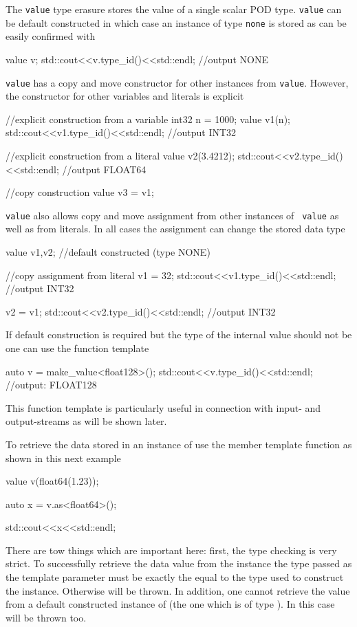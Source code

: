 The {\tt value} type erasure stores the value of a single scalar POD type. 
{\tt value} can be default constructed in which case an instance of type 
{\tt none} is stored as can be easily confirmed with
\begin{cppcode}
value v;
std::cout<<v.type_id()<<std::endl; //output NONE
\end{cppcode}
{\tt value} has a copy and move constructor for other instances from 
{\tt value}. However, the constructor for other variables and literals is 
explicit 
\begin{cppcode}
//explicit construction from a variable
int32 n = 1000;
value v1(n);     
std::cout<<v1.type_id()<<std::endl; //output INT32

//explicit construction from a literal
value v2(3.4212); 
std::cout<<v2.type_id()<<std::endl; //output FLOAT64

//copy construction
value v3 = v1;
\end{cppcode}
{\tt value} also allows copy and move assignment from other instances of {\tt
value} as well as from literals. In all cases the assignment can change the
stored data type
\begin{cppcode}
value v1,v2;  //default constructed  (type NONE)

//copy assignment from literal
v1 = 32;  
std::cout<<v1.type_id()<<std::endl;  //output INT32

v2 = v1;
std::cout<<v2.type_id()<<std::endl;  //output INT32
\end{cppcode}
If default construction is required but the type of the internal value should
not be  one can use the  function template 
\begin{cppcode}
auto v = make_value<float128>();
std::cout<<v.type_id()<<std::endl; //output: FLOAT128
\end{cppcode}
This function template is particularly useful in connection with input- and
output-streams as will be shown later. 

To retrieve the data stored in an instance of  use the 
member template function as shown in this next example
\begin{cppcode}
value v(float64(1.23));

auto x = v.as<float64>();

std::cout<<x<<std::endl;
\end{cppcode}
There are tow things which are important here: first, the type checking is very
strict. To successfully retrieve the data value from the  instance
the type passed as the template parameter must be exactly the equal to the type
used to construct the  instance. Otherwise  will be
thrown. In addition, one cannot retrieve the value from a default constructed
instance of  (the one which is of type ). In this case 
 will be thrown too.

